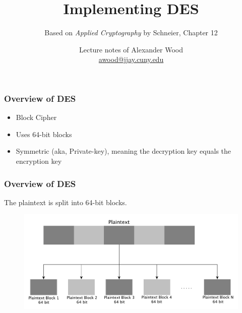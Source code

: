 \documentclass{beamer}
\title[DES]{Implementing DES}
\subtitle{Based on \emph{Applied Cryptography} by Schneier, Chapter 12}
\author
{Lecture notes of Alexander Wood \\ \scriptsize \href{mailto:awood@jjay.cuny.edu}{awood@jjay.cuny.edu}}
\institute[JJay]{John Jay College of Criminal Justice}
\date{}
\newcommand{\<}{\langle}
\renewcommand{\>}{\rangle}
\begin{document}

\begin{frame}
  \titlepage
\end{frame}


\begin{frame}
\frametitle{Overview of DES}

\begin{itemize}
\item Block Cipher
\item Uses 64-bit blocks
\item Symmetric (aka, Private-key), meaning the decryption key equals the encryption key
\end{itemize}
\end{frame}


\begin{frame}
\frametitle{Overview of DES}

The plaintext is split into 64-bit blocks. 
\begin{figure}
\includegraphics[scale=.37]{IMG/hashblocks}
\end{figure}
\end{frame}
\end{document}
